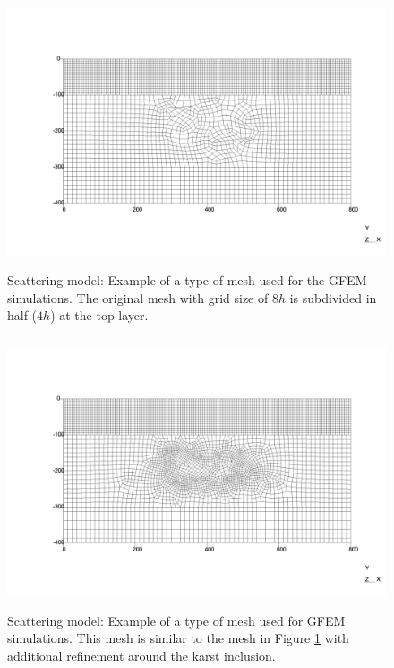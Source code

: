  \begin{figure}[h!]
	\centering
	\includegraphics[width=16cm, height=8cm]{Thesis_Edith/figures/scattering/mesh_ref_mr3_v2.pdf}
	\caption{Scattering model: Example of a type of mesh used for the GFEM simulations. The original mesh with grid size of $8h$ is subdivided in half ($4h$) at the top layer.}
	\label{fig:3.25}
\end{figure}

 \begin{figure}[h!]
	\centering
	\includegraphics[width=16cm, height=8cm]{Thesis_Edith/figures/scattering/meshr_ref_v2.pdf}
	\caption{Scattering model: Example of a type of mesh used for GFEM simulations. This mesh is similar to the mesh in Figure \ref{fig:3.25} with additional refinement around the karst inclusion.}
	\label{fig:3.26}
\end{figure}

